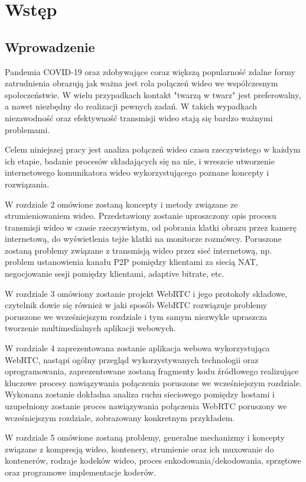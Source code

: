 \chapter{Wstęp}
\section{Wprowadzenie}

Pandemia COVID-19 oraz zdobywające coraz większą popularność zdalne formy zatrudnienia obrazują jak ważna jest rola
połączeń wideo we współczesnym społeczeństwie. W wielu przypadkach kontakt "twarzą w twarz" jest preferowalny, a nawet
niezbędny do realizacji pewnych zadań. W takich wypadkach niezawodność oraz efektywność transmisji wideo stają się
bardzo ważnymi problemami.

Celem niniejszej pracy jest analiza połączeń wideo czasu rzeczywistego w każdym ich etapie, badanie procesów
składających się na nie, i wreszcie utworzenie internetowego komunikatora wideo wykorzystującego poznane koncepty i
rozwiązania.

W rozdziale 2 omówione zostaną koncepty i metody związane ze strumieniowaniem wideo. Przedstawiony zostanie uproszczony
opis procesu transmisji wideo w czasie rzeczywistym, od pobrania klatki obrazu przez kamerę internetową, do wyświetlenia
tejże klatki na monitorze rozmówcy. Poruszone zostaną problemy związane z transmisją wideo przez sieć internetową, np.
problem ustanowienia kanału P2P pomiędzy klientami za siecią NAT, negocjowanie sesji pomiędzy klientami, adaptive
bitrate, etc.

W rozdziale 3 omówiony zostanie projekt WebRTC i jego protokoły składowe, czytelnik dowie się również w jaki sposób
WebRTC rozwiązuje problemy poruszone we wcześniejszym rozdziale i tym samym niezwykle upraszcza tworzenie
multimedialnych aplikacji webowych.

W rozdziale 4 zaprezentowana zostanie aplikacja webowa wykorzystująca WebRTC, nastąpi ogólny przegląd wykorzystywanych
technologii oraz oprogramowania, zaprezentowane zostaną fragmenty kodu źródłowego realizujące kluczowe procesy
nawiązywania połączenia poruszone we wcześniejszym rozdziale. Wykonana zostanie dokładna analiza ruchu sieciowego
pomiędzy hostami i uzupełniony zostanie proces nawiązywania połączenia WebRTC poruszony we wcześniejszym rozdziale,
zobrazowany konkretnym przykładem.

W rozdziale 5 omówione zostaną problemy, generalne mechanizmy i koncepty związane z kompresją wideo, kontenery,
strumienie oraz ich muxowanie do kontenerów, rodzaje kodeków wideo, proces enkodowania/dekodowania, sprzętowe oraz
programowe implementacje koderów.

